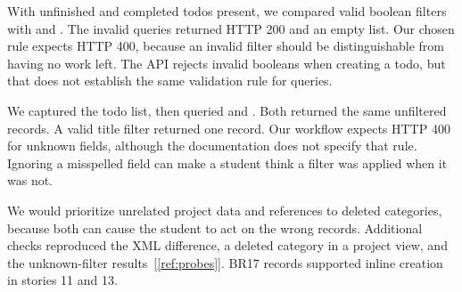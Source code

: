 With unfinished and completed todos present, we compared valid boolean filters
with  and . The invalid
queries returned HTTP 200 and an empty list. Our chosen rule expects HTTP 400,
because an invalid filter should be distinguishable from having no work left.
The API rejects invalid booleans when creating a todo, but that does not establish
the same validation rule for queries.

We captured the todo list, then queried  and .
Both returned the same unfiltered records. A valid title filter returned one
record. Our workflow expects HTTP 400 for unknown fields, although the
documentation does not specify that rule. Ignoring a misspelled field can make
a student think a filter was applied when it was not.

We would prioritize unrelated project data and references to deleted categories,
because both can cause the student to act on the wrong records. Additional
checks reproduced the XML difference, a deleted category in a project
view, and the unknown-filter results~[\ref{ref:probes}]. BR17 records supported
inline creation in stories 11 and 13.
